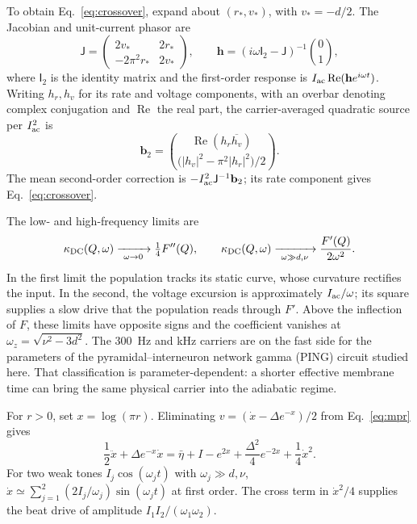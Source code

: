 To obtain Eq.~\eqref{eq:crossover}, expand about $(r_*,v_*)$, with
$v_*=-d/2$. The Jacobian and unit-current phasor are
\[
\mathsf J=\begin{pmatrix}2v_*&2r_*\\-2\pi^2r_*&2v_*\end{pmatrix},\qquad
\mathbf h=(i\omega\mathsf I_2-\mathsf J)^{-1}\binom{0}{1},
\]
where $\mathsf I_2$ is the identity matrix and the first-order response is
$I_{\rm ac}\operatorname{Re}(\mathbf h e^{i\omega t})$.
Writing $h_r,h_v$ for its rate and voltage components, with an overbar denoting
complex conjugation and $\operatorname{Re}$ the real part, the carrier-averaged
quadratic source per $I_{\rm ac}^2$ is
\[
\mathbf b_2=\binom{\operatorname{Re}(h_r\overline{h_v})}{\big(|h_v|^2-\pi^2|h_r|^2\big)/2}.
\]
The mean second-order correction is $-I_{\rm ac}^2\mathsf J^{-1}\mathbf b_2$;
its rate component gives Eq.~\eqref{eq:crossover}.

The low- and high-frequency limits are
\begin{equation}
\kappa_{\rm DC}(Q,\omega)\xrightarrow[\ \omega\to0\ ]{}\tfrac14F''(Q),\qquad
\kappa_{\rm DC}(Q,\omega)\xrightarrow[\ \omega\gg d,\nu\ ]{}\frac{F'(Q)}{2\omega^2}.
\label{eq:crossover_limits}
\end{equation}
In the first limit the population tracks its static curve, whose curvature rectifies
the input. In the second, the voltage excursion is approximately $I_{\rm ac}/\omega$; its
square supplies a slow drive that the population reads through $F'$. Above the
inflection of $F$, these limits have opposite signs and the coefficient vanishes at
$\omega_z=\sqrt{\nu^2-3d^2}$. The $300$~Hz and kHz carriers
are on the fast side for the parameters of the pyramidal--interneuron network gamma
(PING) circuit studied here. That classification is
parameter-dependent: a shorter effective membrane time can bring the same physical
carrier into the adiabatic regime.

For $r>0$, set $x=\log(\pi r)$. Eliminating $v=(\dot x-\Delta e^{-x})/2$
from Eq.~\eqref{eq:mpr} gives
\begin{equation}
\frac{1}{2}\ddot x+\Delta e^{-x}\dot x
=\bar\eta+I-e^{2x}+\frac{\Delta^2}{4}e^{-2x}+\frac{1}{4}\dot x^2.
\label{eq:mpr-log-rate}
\end{equation}
For two weak tones $I_j\cos(\omega_j t)$ with $\omega_j\gg d,\nu$,
$\dot x\simeq\sum_{j=1}^2(2I_j/\omega_j)\sin(\omega_j t)$ at first order.
The cross term in $\dot x^2/4$ supplies the beat drive of amplitude
$I_1 I_2/(\omega_1\omega_2)$.
